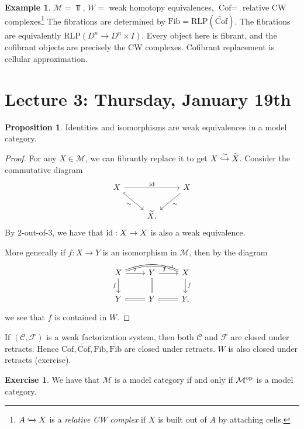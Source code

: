 \documentclass[12pt]{amsart}
\let\til\widetilde
\theoremstyle{definition}
\newtheorem{example}[theorem]{Example}
\newtheorem{exercise}[theorem]{Exercise}
\newtheorem{proposition}[theorem]{Proposition}
\providecommand{\Cof}{\text{Cof}}
\providecommand{\Fib}{\text{Fib}}
\providecommand{\RLP}{\text{RLP}}
\begin{document}
\begin{example} $\mathcal{M} = \Top$, $W=$ weak homotopy equivalences, $\Cof=$ relative CW complexes\footnote{$A\xhookrightarrow{} X$ is a \textit{relative CW complex} if $X$ is built out of $A$ by attaching cells.} The fibrations are determined by $\Fib = \RLP(\widetilde{\Cof})$. The fibrations are equivalently $\RLP(D^n \to D^n \times I)$. Every object here is fibrant, and the cofibrant objects are precisely the CW complexes. Cofibrant replacement is cellular approximation.
\end{example}

\section{Lecture 3: Thursday, January 19th}

\begin{proposition}\label{prop:labelname} Identities and isomorphisms are weak equivalences in a model category.
\end{proposition}
\begin{proof} For any $X \in \mathcal{M}$, we can fibrantly replace it to get $X \xhookto{\sim} \til{X}$. Consider the commutative diagram
\[ \begin{tikzcd}
    X\ar[rr,"\id"]\ar[dr,hook,"\sim" below left] &  & X\ar[dl,"\sim" below right]\\
     & \til{X}. & 
\end{tikzcd} \]
By 2-out-of-3, we have that $\text{id}:X \to X$ is also a weak equivalence.

More generally if $f:X \to Y$ is an isomorphism in $\mathcal{M}$, then by the diagram
\[ \begin{tikzcd}
    X\dar["f" left]\rar["f" above]\ar[rr,equal,bend left=20] & Y\dar[equal]\rar["f^{-1}"] & X\dar["f" right]\\
    Y\rar[equal] & Y\rar[equal] & Y,
\end{tikzcd} \]
we see that $f$ is contained in $W$.
\end{proof}

If $\left( \mathscr{C},\mathscr{F} \right)$ is a weak factorization system, then both $\mathscr{C}$ and $\mathscr{F}$ are closed under retracts. Hence $\Cof, \til{\Cof}, \Fib, \til{\Fib}$ are closed under retracts. $W$ is also closed under retracts (exercise).

\begin{exercise} We have that $\mathcal{M}$ is a model category if and only if $\mathcal{M}^{\text{op}}$ is a model category.
\end{exercise}
\end{document}
